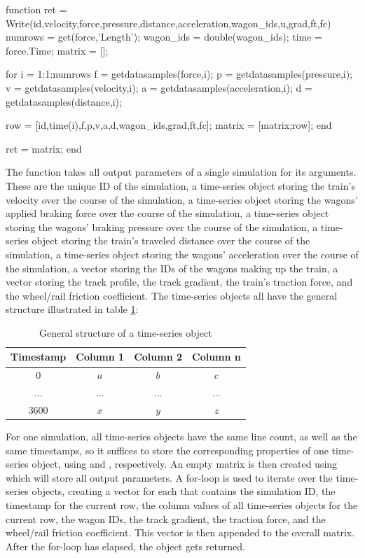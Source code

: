 \bigskip
\begin{python}
function ret = Write(id,velocity,force,pressure,distance,acceleration,wagon_ids,u,grad,ft,fc)
	numrows = get(force,'Length');
	wagon_ids = double(wagon_ids);
	time = force.Time;
	matrix = [];
	
	for i = 1:1:numrows
		f = getdatasamples(force,i);
		p = getdatasamples(pressure,i);
		v = getdatasamples(velocity,i);
		a = getdatasamples(acceleration,i);
		d = getdatasamples(distance,i);
		
		row = [id,time(i),f,p,v,a,d,wagon_ids,grad,ft,fc];
		matrix = [matrix;row];
	end
	
	ret = matrix;
end
\end{python}
\bigskip

\noindent
The  function takes all output parameters of a single simulation for its arguments. These are the unique ID of the simulation, a time-series object storing the train's velocity over the course of the simulation, a time-series object storing the wagons' applied braking force over the course of the simulation, a time-series object storing the wagons' braking pressure over the course of the simulation, a time-series object storing the train's traveled distance over the course of the simulation, a time-series object storing the wagons' acceleration over the course of the simulation, a vector storing the IDs of the wagons making up the train, a vector storing the track profile, the track gradient, the train's traction force, and the wheel/rail friction coefficient. The time-series objects all have the general structure illustrated in table \ref{tab:timeseries}:

\bigskip
\begin{table}[htb!]
	\centering
	\begin{tabular}{c|c|c|c}
		Timestamp & Column 1 & Column 2 & Column n \\
		\hline
		0 & $a$ & $b$ & $c$ \\
		\hline
		... & ... & ... & ... \\
		\hline
		3600 & $x$ & $y$ & $z$ \\
	\end{tabular}
	\caption{General structure of a time-series object}
	\label{tab:timeseries}
\end{table}

\bigskip

\noindent
For one simulation, all time-series objects have the same line count, as well as the same timestamps, so it suffices to store the corresponding properties of one time-series object, using  and , respectively. An empty matrix is then created using  which will store all output parameters. A for-loop is used to iterate over the time-series objects, creating a vector for each  that contains the simulation ID, the timestamp for the current row, the column values of all time-series objects for the current row, the wagon IDs, the track gradient, the traction force, and the wheel/rail friction coefficient. This vector is then appended to the overall matrix. After the for-loop has elapsed, the  object gets returned.

